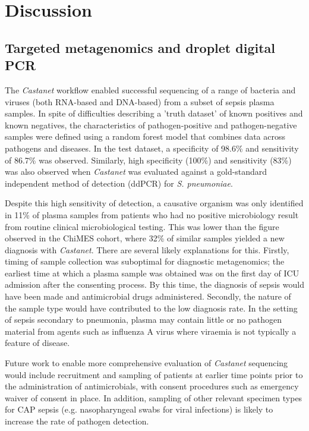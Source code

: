 \section{Discussion}
\subsection{Targeted metagenomics and droplet digital PCR}
The \textit{Castanet} workflow enabled successful sequencing of a range of bacteria and viruses (both RNA-based and DNA-based) from a subset of sepsis plasma samples. In spite of difficulties describing a 'truth dataset' of known positives and known negatives, the characteristics of pathogen-positive and pathogen-negative samples were defined using a random forest model that combines data across pathogens and diseases. In the test dataset, a specificity of 98.6\% and sensitivity of 86.7\% was observed. Similarly, high specificity (100\%) and sensitivity (83\%) was also observed when \textit{Castanet} was evaluated against a gold-standard independent method of detection (ddPCR) for \textit{S. pneumoniae}.

Despite this high sensitivity of detection, a causative organism was only identified in 11\% of plasma samples from patients who had no positive microbiology result from routine clinical microbiological testing. This was lower than the figure observed in the ChiMES cohort, where 32\% of similar samples yielded a new diagnosis with \textit{Castanet}. There are several likely explanations for this. Firstly, timing of sample collection was suboptimal for diagnostic metagenomics; the earliest time at which a plasma sample was obtained was on the first day of ICU admission after the consenting process. By this time, the diagnosis of sepsis would have been made and antimicrobial drugs administered. Secondly, the nature of the sample type would have contributed to the low diagnosis rate. In the setting of sepsis secondary to pneumonia, plasma may contain little or no pathogen material from agents such as influenza A virus where viraemia is not typically a feature of disease.

Future work to enable more comprehensive evaluation of \textit{Castanet} sequencing would include recruitment and sampling of patients at earlier time points prior to the administration of antimicrobials, with consent procedures such as emergency waiver of consent in place. In addition, sampling of other relevant specimen types for CAP sepsis (e.g. nasopharyngeal swabs for viral infections) is likely to increase the rate of pathogen detection. 

